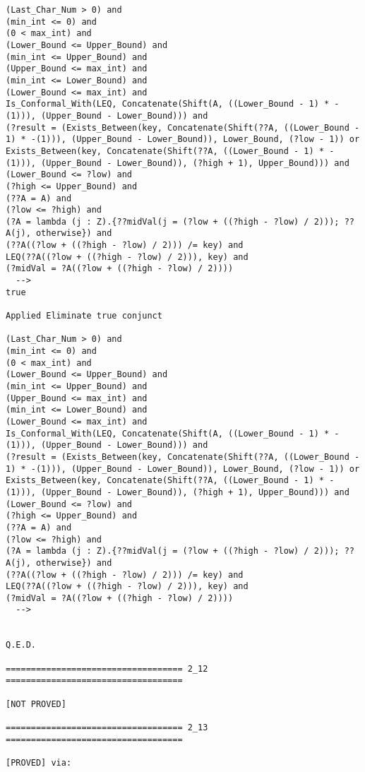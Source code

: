 \begin{lstlisting}[language=resolve]
(Last_Char_Num > 0) and
(min_int <= 0) and
(0 < max_int) and
(Lower_Bound <= Upper_Bound) and
(min_int <= Upper_Bound) and
(Upper_Bound <= max_int) and
(min_int <= Lower_Bound) and
(Lower_Bound <= max_int) and
Is_Conformal_With(LEQ, Concatenate(Shift(A, ((Lower_Bound - 1) * -(1))), (Upper_Bound - Lower_Bound))) and
(?result = (Exists_Between(key, Concatenate(Shift(??A, ((Lower_Bound - 1) * -(1))), (Upper_Bound - Lower_Bound)), Lower_Bound, (?low - 1)) or Exists_Between(key, Concatenate(Shift(??A, ((Lower_Bound - 1) * -(1))), (Upper_Bound - Lower_Bound)), (?high + 1), Upper_Bound))) and
(Lower_Bound <= ?low) and
(?high <= Upper_Bound) and
(??A = A) and
(?low <= ?high) and
(?A = lambda (j : Z).{??midVal(j = (?low + ((?high - ?low) / 2))); ??A(j), otherwise}) and
(??A((?low + ((?high - ?low) / 2))) /= key) and
LEQ(??A((?low + ((?high - ?low) / 2))), key) and
(?midVal = ?A((?low + ((?high - ?low) / 2))))
  -->
true

Applied Eliminate true conjunct

(Last_Char_Num > 0) and
(min_int <= 0) and
(0 < max_int) and
(Lower_Bound <= Upper_Bound) and
(min_int <= Upper_Bound) and
(Upper_Bound <= max_int) and
(min_int <= Lower_Bound) and
(Lower_Bound <= max_int) and
Is_Conformal_With(LEQ, Concatenate(Shift(A, ((Lower_Bound - 1) * -(1))), (Upper_Bound - Lower_Bound))) and
(?result = (Exists_Between(key, Concatenate(Shift(??A, ((Lower_Bound - 1) * -(1))), (Upper_Bound - Lower_Bound)), Lower_Bound, (?low - 1)) or Exists_Between(key, Concatenate(Shift(??A, ((Lower_Bound - 1) * -(1))), (Upper_Bound - Lower_Bound)), (?high + 1), Upper_Bound))) and
(Lower_Bound <= ?low) and
(?high <= Upper_Bound) and
(??A = A) and
(?low <= ?high) and
(?A = lambda (j : Z).{??midVal(j = (?low + ((?high - ?low) / 2))); ??A(j), otherwise}) and
(??A((?low + ((?high - ?low) / 2))) /= key) and
LEQ(??A((?low + ((?high - ?low) / 2))), key) and
(?midVal = ?A((?low + ((?high - ?low) / 2))))
  -->


Q.E.D.

=================================== 2_12 ===================================

[NOT PROVED]

=================================== 2_13 ===================================

[PROVED] via:


\end{lstlisting}

